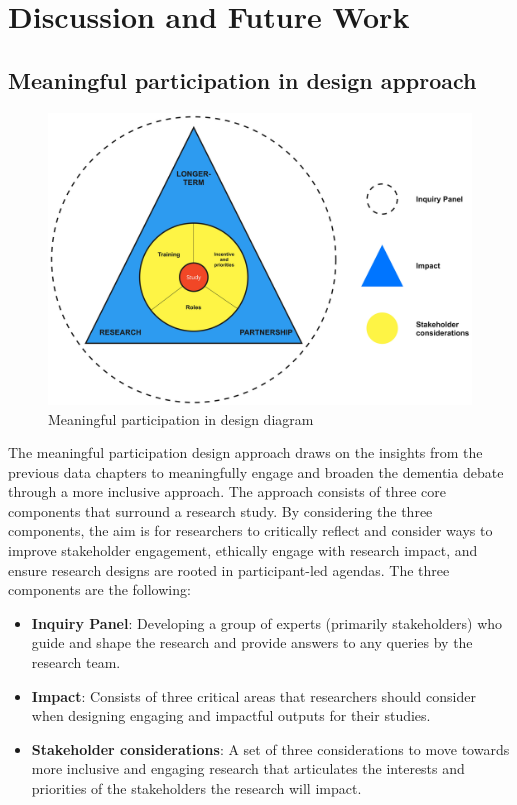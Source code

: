 \chapter{Discussion and Future Work}
\label{Discussion}

\section{Meaningful participation in design approach}
\label{Discussion:Design}

\begin{figure}[htp]
\centering
\includegraphics[width=0.8\linewidth]{Images/Discussion/DesignApproach.jpg}
\caption{Meaningful participation in design diagram}
\label{fig:MeaningfulParticipation}
\end{figure}
The meaningful participation design approach draws on the insights from the previous data chapters to meaningfully engage and broaden the dementia debate through a more inclusive approach. The approach consists of three core components that surround a research study. By considering the three components, the aim is for researchers to critically reflect and consider ways to improve stakeholder engagement, ethically engage with research impact, and ensure research designs are rooted in participant-led agendas. The three components are the following:

\begin{itemize}
    \item \textbf{Inquiry Panel}: Developing a group of experts (primarily stakeholders) who guide and shape the research and provide answers to any queries by the research team.
    \item \textbf{Impact}: Consists of three critical areas that researchers should consider when designing engaging and impactful outputs for their studies.
    \item \textbf{Stakeholder considerations}: A set of three considerations to move towards more inclusive and engaging research that articulates the interests and priorities of the stakeholders the research will impact.
\end{itemize}

